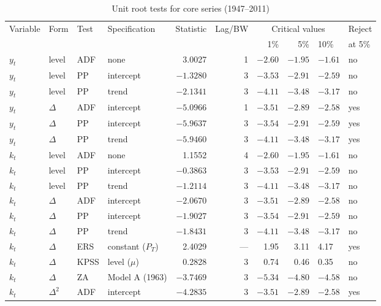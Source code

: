 \begin{longtable}[t]{llllrrrrll}
\caption{Unit root tests for core series (1947--2011)}\label{tab:app_unit_roots}\\
\toprule
Variable & Form & Test & Specification & Statistic & Lag/BW & \multicolumn{3}{c}{Critical values} & Reject \\
\cmidrule(lr){7-9}
& & & & & & 1\% & 5\% & 10\% & at 5\% \\
\midrule
$y_t$ & level & ADF & none & 3.0027 & 1 & $-2.60$ & $-1.95$ & $-1.61$ & no \\
$y_t$ & level & PP & intercept & $-1.3280$ & 3 & $-3.53$ & $-2.91$ & $-2.59$ & no \\
$y_t$ & level & PP & trend & $-2.1341$ & 3 & $-4.11$ & $-3.48$ & $-3.17$ & no \\
$y_t$ & $\Delta$ & ADF & intercept & $-5.0966$ & 1 & $-3.51$ & $-2.89$ & $-2.58$ & yes \\
$y_t$ & $\Delta$ & PP & intercept & $-5.9637$ & 3 & $-3.54$ & $-2.91$ & $-2.59$ & yes \\
$y_t$ & $\Delta$ & PP & trend & $-5.9460$ & 3 & $-4.11$ & $-3.48$ & $-3.17$ & yes \\
\addlinespace
$k_t$ & level & ADF & none & 1.1552 & 4 & $-2.60$ & $-1.95$ & $-1.61$ & no \\
$k_t$ & level & PP & intercept & $-0.3863$ & 3 & $-3.53$ & $-2.91$ & $-2.59$ & no \\
$k_t$ & level & PP & trend & $-1.2114$ & 3 & $-4.11$ & $-3.48$ & $-3.17$ & no \\
$k_t$ & $\Delta$ & ADF & intercept & $-2.0670$ & 3 & $-3.51$ & $-2.89$ & $-2.58$ & no \\
$k_t$ & $\Delta$ & PP & intercept & $-1.9027$ & 3 & $-3.54$ & $-2.91$ & $-2.59$ & no \\
$k_t$ & $\Delta$ & PP & trend & $-1.8431$ & 3 & $-4.11$ & $-3.48$ & $-3.17$ & no \\
$k_t$ & $\Delta$ & ERS & constant ($P_T$) & 2.4029 & --- & 1.95 & 3.11 & 4.17 & yes \\
$k_t$ & $\Delta$ & KPSS & level ($\mu$) & 0.2828 & 3 & 0.74 & 0.46 & 0.35 & no \\
$k_t$ & $\Delta$ & ZA & Model A (1963) & $-3.7469$ & 3 & $-5.34$ & $-4.80$ & $-4.58$ & no \\
$k_t$ & $\Delta^2$ & ADF & intercept & $-4.2835$ & 3 & $-3.51$ & $-2.89$ & $-2.58$ & yes \\
\bottomrule
\end{longtable}
